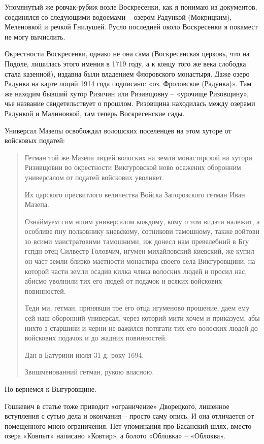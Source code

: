 Упомянутый же ровчак-рубиж возле Воскресенки, как я понимаю из документов, соединялся со следующими водоемами – озером Радункой (Мокрицким), Меленовкой и речкой Гнилушей. Русло последней около Воскресенки я покамест не могу вычислить.

Окрестности Воскресенки, однако не она сама (Воскресенская церковь, что на Подоле, лишилась этого имения в 1719 году, а к концу того же века слободка стала казенной), издавна были владением Флоровского монастыря. Даже озеро Радунка на карте лоций 1914 года подписано: «оз. Фроловское (Радунка)». Там же находим бывший хутор Ризичин или Ризивщовну – «урочище Ризовщину», чье название свидетельствует о прошлом. Ризовщина находилась между озерами Радункой и Малиновкой, там теперь Воскресенские сады.

Универсал Мазепы освобождал волошских поселенцев на этом хуторе от войсковых податей\cite[96]{mihdocs}: 

\begin{quotation}
Гетман той же Мазепа людей волоских на земли монастирской на хутори Ризивщовни во окрестности Викгуровской ново осажених оборонним универсалом от податей войскових уволняет.

Их царского пресвитлого величества Войска Запорозского гетман Иван Мазепа.

Ознаймуем сим ншим универсалом кождому, кому о том видати належит, а особливе пну полковнику киевскому, сотникови тамошному, также войтови зо всими маистратовими тамошними, иж донесл нам превелебний в Бгу гспдн отец Силвестр Головчич, игумен михайловский киевский, же купил он част земли близко маетности монастира своего села Викгуровщини, на которой части земли осадив килка члвка волоских людей и просил нас, абисмо уволнили тих его людей от подачок и всяких войскових повинностей.

Теди ми, гетман, принявши тое его отца игуменово прошение, даем ему сей наш оборонний универсал, через которий мити хочем и приказуем, абы нихто з старшини и черни не важился потягати тих его волоских людей до войскових подачок и до жадних повинностей.

Дан в Батурини июля 31 д. року 1694.

Звишменованний гетман, рукою власною.
\end{quotation}

Но вернемся к Выгуровщине. 

Гошкевич в статье тоже приводит «ограничение» Дворецкого, лишенное вступления с сутью дела и окончания – просто саму опись. И она отличается от помещенного мною ограничения. Нет упоминания про Басанский шлях, вместо озера «Ковпыт» написано «Ковтир», а болото «Обловка» – «Облоква».

